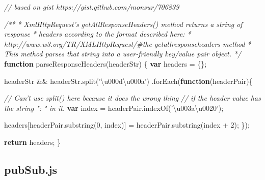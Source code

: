 \documentclass[12pt, ]{article}
\newenvironment{Shaded}{}{}
\newcommand{\KeywordTok}[1]{\textcolor[rgb]{0.00,0.44,0.13}{\textbf{{#1}}}}
\newcommand{\DecValTok}[1]{\textcolor[rgb]{0.25,0.63,0.44}{{#1}}}
\newcommand{\StringTok}[1]{\textcolor[rgb]{0.25,0.44,0.63}{{#1}}}
\newcommand{\CommentTok}[1]{\textcolor[rgb]{0.38,0.63,0.69}{\textit{{#1}}}}
\newcommand{\OtherTok}[1]{\textcolor[rgb]{0.00,0.44,0.13}{{#1}}}
\newcommand{\FunctionTok}[1]{\textcolor[rgb]{0.02,0.16,0.49}{{#1}}}
\newcommand{\NormalTok}[1]{{#1}}
\begin{document}
\label{src_parseResponseHeaders.browser}

\begin{Shaded}
\begin{Highlighting}[]
\CommentTok{// based on gist https://gist.github.com/monsur/706839}

\CommentTok{/**}
\CommentTok{ * XmlHttpRequest's getAllResponseHeaders() method returns a string of response}
\CommentTok{ * headers according to the format described here:}
\CommentTok{ * http://www.w3.org/TR/XMLHttpRequest/#the-getallresponseheaders-method}
\CommentTok{ * This method parses that string into a user-friendly key/value pair object.}
\CommentTok{ */}
\KeywordTok{function} \FunctionTok{parseResponseHeaders}\NormalTok{(headerStr) \{}
   \KeywordTok{var} \NormalTok{headers = \{\};}
   
   \NormalTok{headerStr && }\OtherTok{headerStr}\NormalTok{.}\FunctionTok{split}\NormalTok{(}\StringTok{'\textbackslash{}u000d\textbackslash{}u000a'}\NormalTok{)}
      \NormalTok{.}\FunctionTok{forEach}\NormalTok{(}\KeywordTok{function}\NormalTok{(headerPair)\{}
   
         \CommentTok{// Can't use split() here because it does the wrong thing}
         \CommentTok{// if the header value has the string ": " in it.}
         \KeywordTok{var} \NormalTok{index = }\OtherTok{headerPair}\NormalTok{.}\FunctionTok{indexOf}\NormalTok{(}\StringTok{'\textbackslash{}u003a\textbackslash{}u0020'}\NormalTok{);}
         
         \NormalTok{headers[}\OtherTok{headerPair}\NormalTok{.}\FunctionTok{substring}\NormalTok{(}\DecValTok{0}\NormalTok{, index)] }
                     \NormalTok{= }\OtherTok{headerPair}\NormalTok{.}\FunctionTok{substring}\NormalTok{(index + }\DecValTok{2}\NormalTok{);}
      \NormalTok{\});}
   
   \KeywordTok{return} \NormalTok{headers;}
\NormalTok{\}}
\end{Highlighting}
\end{Shaded}

\pagebreak

\subsection{pubSub.js}\label{headerux5fpubSub}

\label{src_pubSub}
\end{document}

